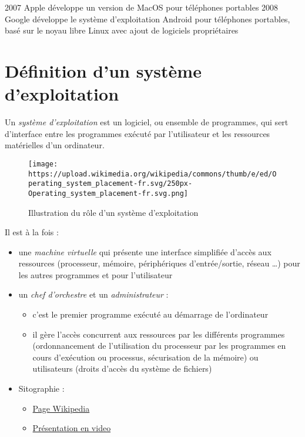 \documentclass[
  11pt,
]{article}
\providecommand{\tightlist}{%
  \setlength{\itemsep}{0pt}\setlength{\parskip}{0pt}}
\newcounter{prop}
\newcounter{cours}
\newcounter{prog}
\newcounter{logi}
\begin{document}
2007 Apple développe un version de MacOS pour téléphones portables 2008
Google développe le système d'exploitation Android pour téléphones
portables, basé sur le noyau libre Linux avec ajout de logiciels
propriétaires

\hypertarget{duxe9finition-dun-systuxe8me-dexploitation}{%
\section{Définition d'un système
d'exploitation}\label{duxe9finition-dun-systuxe8me-dexploitation}}

Un \emph{système d'exploitation} est un logiciel, ou ensemble de
programmes, qui sert d'interface entre les programmes exécuté par
l'utilisateur et les ressources matérielles d'un ordinateur.

\begin{figure}
\centering
\texttt{[image: https://upload.wikimedia.org/wikipedia/commons/thumb/e/ed/Operating\_system\_placement-fr.svg/250px-Operating\_system\_placement-fr.svg.png]}
\caption{Illustration du rôle d'un système d'exploitation}
\end{figure}

Il est à la fois :

\begin{itemize}
\item
  une \emph{machine virtuelle} qui présente une interface simplifiée
  d'accès aux ressources (processeur, mémoire, périphériques
  d'entrée/sortie, réseau \ldots{}) pour les autres programmes et pour
  l'utilisateur
\item
  un \emph{chef d'orchestre} et un \emph{administrateur} :

  \begin{itemize}
  \tightlist
  \item
    c'est le premier programme exécuté au démarrage de l'ordinateur
  \item
    il gère l'accès concurrent aux ressources par les différents
    programmes (ordonnancement de l'utilisation du processeur par les
    programmes en cours d'exécution ou processus, sécurisation de la
    mémoire) ou utilisateurs (droits d'accès du système de fichiers)
  \end{itemize}
\item
  Sitographie :

  \begin{itemize}
  \tightlist
  \item
    \href{https://fr.wikipedia.org/wiki/Syst\%C3\%A8me_d\%27exploitation}{Page
    Wikipedia}
  \item
    \href{https://www.lumni.fr/video/comprendre-ce-qu-est-un-systeme-d-exploitation}{Présentation
    en video}
  \end{itemize}
\end{itemize}
\end{document}
